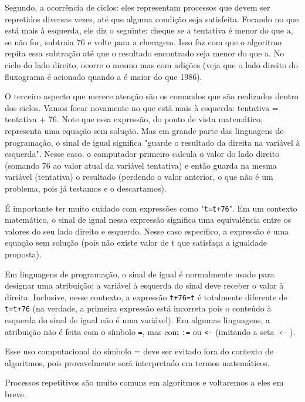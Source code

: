 Segundo, a ocorrência de ciclos: eles representam processos que devem ser repretidos diversas vezes, até que alguma condição seja satisfeita. Focando no que está mais à esquerda, ele diz o seguinte: cheque se a tentativa é menor do que a, se não for, subtraia 76 e volte para a checagem. Isso faz com que o algoritmo repita essa subtração até que o resultado encontrado seja menor do que a. No ciclo do lado direito, ocorre o mesmo mas com adições (veja que o lado direito do fluxograma é acionado quando a é maior do que 1986).

O terceiro aspecto que merece atenção são os comandos que são realizados dentro dos ciclos. Vamos focar novamente no que está mais à esquerda: tentativa = tentativa + 76. Note que essa expressão, do ponto de vista matemático, representa uma equação sem solução. Mas em grande parte das linguagens de programação, o sinal de igual significa "guarde o resultado da direita na variável à esquerda". Nesse caso, o computador primeiro calcula o valor do lado direito (somando 76 ao valor atual da variável tentativa) e então guarda na mesma variável (tentativa) o resultado (perdendo o valor anterior, o que não é um problema, pois já testamos e o descartamos).

\begin{observation}{}
É importante ter muito cuidado com expressões como "\verb|t=t+76|". Em um contexto matemático, o sinal de igual nessa expressão significa uma equivalência entre os valores do seu lado direito e esquerdo. Nesse caso específico, a expressão é uma equação sem solução (pois não existe valor de t que satisfaça a igualdade proposta).

Em linguagens de programação, o sinal de igual é normalmente usado para designar uma atribuição: a variável à esquerda do sinal deve receber o valor à direita. Inclusive, nesse contexto, a expressão \verb|t+76=t| é totalmente diferente de \verb|t=t+76| (na verdade, a primeira expressão está incorreta pois o conteúdo à esquerda do sinal de igual não é uma variável). Em algumas linguagens, a atribuição não é feita com o símbolo \verb|=|, mas com \verb|:=| ou \verb|<-| (imitando a seta $\leftarrow$).

Esse uso computacional do símbolo = deve ser evitado fora do contexto de algoritmos, pois provavelmente será interpretado em termos matemáticos.
\end{observation}

Processos repetitivos são muito comuns em algoritmos e voltaremos a eles em breve.

